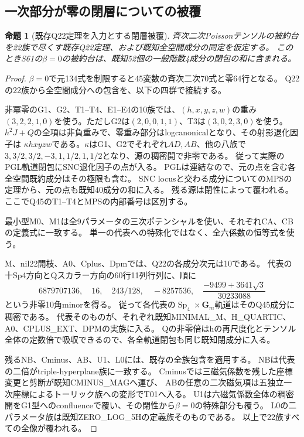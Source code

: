 \documentclass[a4paper,11pt]{ltjsarticle}
\newtheorem{proposition}{命題}[section]
\theoremstyle{definition}
\newcommand{\Sp}{\operatorname{Sp}}
\begin{document}
\subsection{一次部分が零の閉層についての被覆}
\begin{proposition}[既存Q22定理を入力とする閉層被覆]\label{prop:beta-zero}
斉次二次Poissonテンソルの被約台を22族で尽くす既存Q22定理、および既知全空間成分の同定を仮定する。
このときS61の\(\beta=0\)の被約台は、既知52個の一般階数4成分の閉包の和に含まれる。
\end{proposition}
\begin{proof}
\(\beta=0\)で元134式を制限すると45変数の斉次二次70式と零64行となる。
Q22の22族から全空間成分への包含を、以下の四群で接続する。

非冪零のG1、G2、T1--T4、E1--E4の10族では、\((h,x,y,z,w)\)の重み
\((3,2,2,1,0)\)を使う。ただしG2は\((2,0,0,1,1)\)、T3は\((3,0,2,3,0)\)を使う。
\(h^2J+Q\)の全項は非負重みで、零重み部分はlogcanonicalとなり、その射影退化因子は
\(\kappa hxyzw\)である。\(\kappa\)はG1、G2でそれぞれ\(AD,AB\)、他の八族で
\(3,3/2,3/2,-3,1,1/2,1,1/2\)となり、源の稠密開で非零である。
従って実際のPGL軌道閉包にSNC退化因子の点が入る。
PGLは連結なので、元の点を含む各全空間既約成分はその極限も含む。
SNC locusと交わる成分についてのMPSの定理から、元の点も既知40成分の和に入る。
残る源は閉性によって覆われる。ここでQ45のT1--T4とMPSの内部番号は区別する。

最小型M0、M1は全9パラメータの三次ポテンシャルを使い、それぞれCA、CBの定義式に一致する。
単一の代表への特殊化ではなく、全六係数の恒等式を使う。

M、nil22開枝、A0、Cplus、Dpmでは、Q22の各成分次元は10である。
代表の十Sp4方向とQスカラー方向の60行11列行列に、順に
\[
 6879707136,\quad16,\quad243/128,\quad-8257536,\quad
 \frac{-9499+3641\sqrt3}{30233088}
\]
という非零10角minorを得る。
従って各代表の\(\Sp_4\times\mathbf G_m\)軌道はそのQ45成分に稠密である。
代表そのものが、それぞれ既知MINIMAL\_M、H\_QUARTIC、A0、CPLUS\_EXT、DPMの実族に入る。
Qの非零倍はhの再尺度化とテンソル全体の定数倍で吸収できるので、各全軌道閉包も同じ既知閉成分に入る。

残るNB、Cminus、AB、U1、L0には、既存の全族包含を適用する。
NBは代表の二倍がtriple-hyperplane族に一致する。
Cminusでは三磁気係数を残した座標変更と剪断が既知CMINUS\_MAGへ運び、
ABの任意の二次磁気項は五独立一次座標によるトーリック族への変形でT01へ入る。
U1は六磁気係数全体の稠密開をG1型へのconfluenceで覆い、その閉性から\(\beta=0\)の特殊部分も覆う。
L0の二パラメータ族は既知ZERO\_LOG\_5Hの定義族そのものである。
以上で22族すべての全像が覆われる。
\end{proof}
\end{document}
